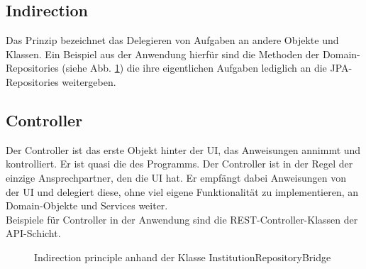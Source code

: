 \subsection{Indirection}
Das Prinzip  bezeichnet das Delegieren von Aufgaben an andere Objekte und Klassen. Ein Beispiel aus der Anwendung hierfür sind die Methoden der Domain-Repositories (siehe Abb. \ref{fig:indirection}) die ihre eigentlichen Aufgaben lediglich an die JPA-Repositories weitergeben.

\subsection{Controller}
Der Controller ist das erste Objekt hinter der UI, das Anweisungen annimmt und kontrolliert. Er ist quasi die  des Programms. Der Controller ist in der Regel der einzige Ansprechpartner, den die UI hat. Er empfängt dabei Anweisungen von der UI und delegiert diese, ohne viel eigene Funktionalität zu implementieren, an Domain-Objekte und Services weiter.\\
Beispiele für Controller in der Anwendung sind die REST-Controller-Klassen der API-Schicht.

\begin{figure}[!htb]
    \caption[Indirection Principle]{Indirection principle anhand der Klasse InstitutionRepositoryBridge}
    \label{fig:indirection}
\end{figure}